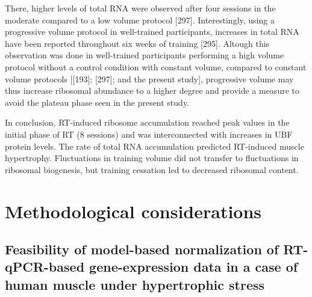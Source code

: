 \documentclass[twoside,10pt]{gihclass} %
\begin{document}
There, higher levels of total RNA were observed after four sessions in the moderate compared to a low volume protocol {[}297{]}.
Interestingly, using a progressive volume protocol in well-trained participants, increases in total RNA have been reported throughout six weeks of training
{[}295{]}.
Altough this observation was done in well-trained participants performing a high volume protocol without a control condition with constant volume, compared to constant volume protocols
{[}{[}193{]};
{[}297{]}; and the present study{]},
progressive volume may thus increase ribosomal abundance to a higher degree and provide a measure to avoid the plateau phase seen in the present study.

In conclusion, RT-induced ribosome accumulation reached peak values in the initial phase of RT (8 sessions) and was interconnected with increases in UBF protein levels. The rate of total RNA accumulation predicted RT-induced muscle hypertrophy. Fluctuations in training volume did not transfer to fluctuations in ribosomal biogenesis, but training cessation led to decreased ribosomal content.

\hypertarget{methodological-considerations}{%
\chapter{Methodological considerations}\label{methodological-considerations}}

\hypertarget{feasibility-of-model-based-normalization-of-rt-qpcr-based-gene-expression-data-in-a-case-of-human-muscle-under-hypertrophic-stress}{%
\section{Feasibility of model-based normalization of RT-qPCR-based gene-expression data in a case of human muscle under hypertrophic stress}\label{feasibility-of-model-based-normalization-of-rt-qpcr-based-gene-expression-data-in-a-case-of-human-muscle-under-hypertrophic-stress}}
\end{document}
